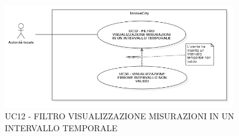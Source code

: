 


\begin{figure}[H]
    \centering
    \includegraphics[width=0.9\textwidth]{../Images/uc12.PNG}
    \caption{UC12 - FILTRO VISUALIZZAZIONE MISURAZIONI IN UN INTERVALLO TEMPORALE}
    \label{fig:UC7}
\end{figure}



